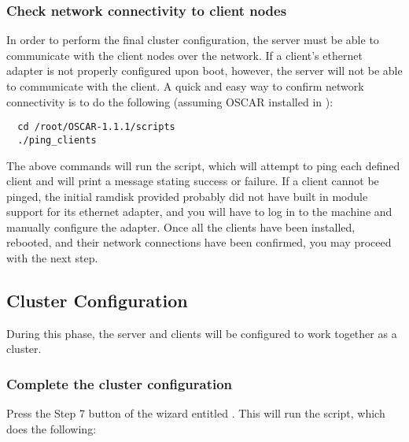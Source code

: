 \subsubsection{Check network connectivity to client nodes}

In order to perform the final cluster configuration, the server must
be able to communicate with the client nodes over the network. If a
client's ethernet adapter is not properly configured upon boot,
however, the server will not be able to communicate with the client. A
quick and easy way to confirm network connectivity is to do the
\begchange
following (assuming OSCAR installed in ):

\begin{verbatim}
  cd /root/OSCAR-1.1.1/scripts
  ./ping_clients
\end{verbatim}
\endchange

The above commands will run the  script, which will
attempt to ping each defined client and will print a message stating
success or failure. If a client cannot be pinged, the initial ramdisk
provided probably did not have built in module support for its
ethernet adapter, and you will have to log in to the machine and
manually configure the adapter. Once all the clients have been
installed, rebooted, and their network connections have been
confirmed, you may proceed with the next step.


\subsection{Cluster Configuration}

During this phase, the server and clients will be configured to work
together as a cluster.

\subsubsection{Complete the cluster configuration}

Press the Step 7 button of the wizard entitled .  This will run the  script,
which does the following:

